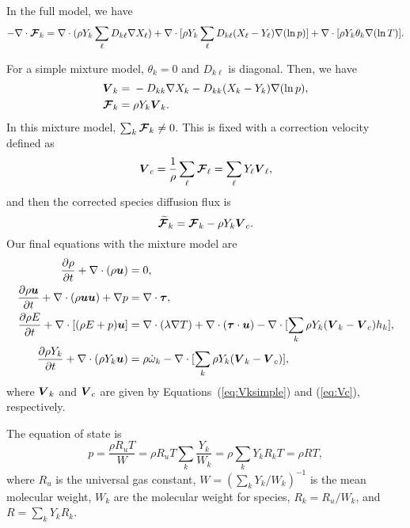\documentclass[11pt,letterpaper]{article}
\renewcommand{\vec}[1]{\mbox{\boldmath$#1$}}
\newcommand{\tensor}[1]{\mbox{\boldmath{\ensuremath{#1}}}}
\begin{document}
In the full model, we have
\begin{equation}
-\nabla \cdot \vec{\mathcal{F}}_k = \nabla \cdot (\rho Y_k \sum_\ell D_{k\ell}
  \nabla X_\ell) + \nabla \cdot [\rho Y_k \sum_\ell D_{k\ell} (X_\ell-Y_\ell)
  \nabla (\ln{p}) ] + \nabla \cdot [\rho
  Y_k \theta_k \nabla (\ln{T})].
\end{equation}

For a simple mixture model, $\theta_k = 0$ and $D_{k\ell}$ is
diagonal.  Then, we have
\begin{align}
\vec{V}_k = {}& -D_{kk} \nabla X_k - D_{kk} (X_k-Y_k)
  \nabla (\ln{p}), \label{eq:Vksimple} \\
\vec{\mathcal{F}}_k = {}& \rho Y_k \vec{V}_k.
\end{align}
In this mixture model, $\sum_k \vec{\mathcal{F}}_k \neq
0$. This is fixed with a correction velocity defined as
\begin{equation}
  \vec{V}_c = \frac{1}{\rho}\sum_\ell \vec{\mathcal{F}}_\ell =
  \sum_\ell Y_\ell \vec{V}_\ell, \label{eq:Vc}
\end{equation}
and then the corrected species diffusion flux is
\begin{equation}
  \vec{\widetilde{\mathcal{F}}}_k = \vec{\mathcal{F}}_k - \rho Y_k \vec{V}_c. \label{eq:corr}
\end{equation}
Our final equations with the mixture model are
\begin{align}
\frac{\partial \rho}{\partial t} + \nabla \cdot (\rho
    \vec{u})= { } & 0, \\
\frac{\partial \rho \vec{u}}{\partial t} + \nabla \cdot (\rho
    \vec{u}\vec{u}) + \nabla p= { } & \nabla \cdot
  \tensor{\tau}, \\
\frac{\partial \rho E}{\partial t} + \nabla \cdot [(\rho E + p)
  \vec{u}] = { } & \nabla \cdot (\lambda \nabla T) + \nabla \cdot
  (\tensor{\tau} \cdot \vec{u}) - \nabla \cdot [\sum_k\rho Y_k
  (\vec{V}_k -\vec{V}_c) h_k ], \label{eq:rhoE2} \\
\frac{\partial \rho Y_k}{\partial t} + \nabla \cdot (\rho Y_k \vec{u})
= { } & \rho \dot{\omega}_k  - \nabla \cdot [\sum_k\rho Y_k
  (\vec{V}_k -\vec{V}_c) ], \label{eq:rhoY2}
\end{align} 
where $\vec{V}_k$ and $\vec{V}_c$ are given by
Equations~(\ref{eq:Vksimple}) and (\ref{eq:Vc}), respectively.

The equation of state is
\begin{equation}
  p = \frac{\rho R_u T}{W} = \rho R_u T \sum_k \frac{Y_k}{W_k} =
  \rho \sum_k Y_k R_k T = \rho R T,
\end{equation}
where $R_u$ is the universal gas constant, $W = (\sum_k Y_k/W_k)^{-1}$
is the mean molecular weight, $W_k$ are the molecular weight for
species, $R_k = R_u/W_k$, and $R = \sum_k Y_k R_k$.
\end{document}
